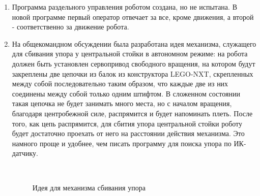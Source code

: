 \begin{enumerate}
\begin{enumerate}
		\item Программа раздельного управления роботом создана, но не испытана. В новой программе первый оператор отвечает за все, кроме движения, а второй - соответственно за движение робота.\newline
		
		\item На общекомандном обсуждении была разработана идея механизма, служащего для сбивания упора у центральной стойки в автономном режиме: на робота должен быть установлен сервопривод свободного вращения, на котором будут закреплены две цепочки из балок из конструктора LEGO-NXT, скрепленных между собой последовательно таким образом, что каждые две из них соединены между собой только одним штифтом. В сложенном состоянии такая цепочка не будет занимать много места, но с началом вращения, благодаря центробежной силе, распрямится и будет напоминать плеть. После того, как цепь распрямится, для сбития упора центральной стойки роботу будет достаточно проехать от него на расстоянии действия механизма. Это намного проще и удобнее, чем писать программу для поиска упора по ИК-датчику.\newline
		
		\begin{figure}[H]
			\begin{minipage}[h]{0.2\linewidth}
				\center  
			\end{minipage}
			\begin{minipage}[h]{0.6\linewidth}
				\caption{Идея для механизма сбивания упора}
			\end{minipage}
		\end{figure}
		
	\end{enumerate}
	

\end{enumerate}
